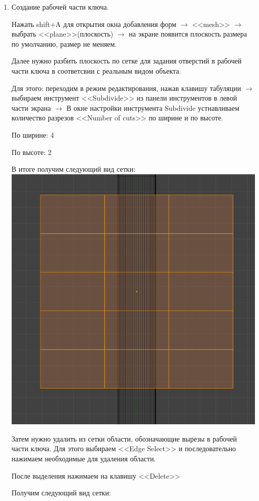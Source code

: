 \documentclass[12pt]{article}
\begin{document}
\begin{enumerate}
\item Создание рабочей части ключа.

Нажать shift+A  для открытия окна добавления форм $\to $  <<mesh>> $\to $ выбрать <<plane>>(плоскость) $\to $  на экране появится плоскость размера по умолчанию, размер не меняем.

Далее нужно разбить плоскость по сетке для задания отверстий в рабочей части ключа в соответсвии с реальным видом объекта.

Для этого:  переходим в режим редактирования, нажав клавишу табуляции $\to $ выбираем инструмент <<Subdivide>> из панели инструментов в левой части экрана $\to $ В окне настройки инструмента Subdivide устнавливаем количество разрезов <<Number of cuts>> по ширине и по высоте.

По ширине: 4

По высоте: 2



В итоге получим следующий вид сетки:
\vskip 1cm
{
    \centering
    \includegraphics[width=0.8\linewidth]{3сетка.png}
    \label{fig:i1}
}
\vskip 1cm


Затем нужно удалить из сетки области, обозначающие вырезы в рабочей части ключа.
Для этого выбираем <<Edge Select>> и последовательно нажимаем необходимые для удаления области.

После выделения нажимаем на клавишу <<Delete>>

Получим следующий вид сетки:


\end{enumerate}
\end{document}
